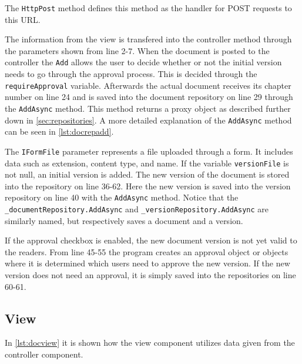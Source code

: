The \texttt{HttpPost} method defines this method as the handler for POST requests to this URL.

The information from the view is transfered into the controller method through the parameters shown from line 2-7.
When the document is posted to the controller the \texttt{Add} allows the user to decide whether or not the initial version needs to go through the approval process. This is decided through the \texttt{requireApproval} variable.
Afterwards the actual document receives its chapter number on line 24 and is saved into the document repository on line 29 through the \texttt{AddAsync} method.
This method returns a proxy object as described further down in \cref{sec:repositories}.
A more detailed explanation of the \texttt{AddAsync} method can be seen in \cref{lst:docrepadd}.

The \texttt{IFormFile} parameter represents a file uploaded through a form. It includes data such as extension, content type, and name.
If the variable \texttt{versionFile} is not null, an initial version is added.
The new version of the document is stored into the repository on line 36-62.
Here the new version is saved into the version repository on line 40 with the \texttt{AddAsync} method.
Notice that the \texttt{_documentRepository.AddAsync} and \texttt{_versionRepository.AddAsync} are similarly named, but respectively saves a document and a version.

If the approval checkbox is enabled, the new document version is not yet valid to the readers.
From line 45-55 the program creates an approval object or objects where it is determined which users need to approve the new version.
If the new version does not need an approval, it is simply saved into the repositories on line 60-61.

\subsection{View}

In \cref{lst:docview} it is shown how the view component utilizes data given from the controller component.

